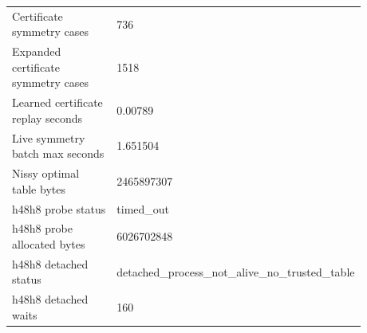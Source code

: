 {\begin{tabular}{@{}p{0.54\linewidth}p{0.34\linewidth}@{}}
Certificate symmetry cases & 736 \\
Expanded certificate symmetry cases & 1518 \\
Learned certificate replay seconds & 0.00789 \\
Live symmetry batch max seconds & 1.651504 \\
Nissy optimal table bytes & 2465897307 \\
h48h8 probe status & timed\_\allowbreak{}out \\
h48h8 probe allocated bytes & 6026702848 \\
h48h8 detached status & detached\_\allowbreak{}process\_\allowbreak{}not\_\allowbreak{}alive\_\allowbreak{}no\_\allowbreak{}trusted\_\allowbreak{}table \\
h48h8 detached waits & 160 \\
\hline
\end{tabular}
}
